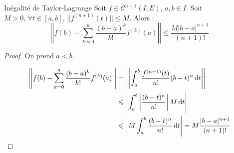 \begin{proposition}{Inégalité de Taylor-Lagrange}{}
    Soit $f \in \mathscr C^{n + 1}(I, E)$, $a, b \in I$.  Soit $M > 0, \, \forall t \in [a, b], \, ||f^{(n + 1)}(t)|| \leqslant M$.
    Alors :
    \[\left|\left| f(b) - \sum_{k = 0 }^{n } \frac{(b - a)^k}{k!} f^{(k)}(a) \right|\right| \leqslant \frac{M |b - a|^{n + 1}}{(n + 1)!}\]
\end{proposition}

\begin{proof}
    On prend $a < b$.

    \begin{align*}
    \left|\left| f(b) - \sum_{k = 0}^n \frac{(b - a)^k}{k!} f^{(k)}(a) \right|\right|  & = \left|\left| \int_a^b \frac{f^{(n + 1)}(t)}{n!} (b - t)^n \,\mathrm{d}t \right|\right| \\
        & \leqslant \left| \int_a^b \left| \frac{(b - t)^n}{n!} \right| M \,\mathrm{d}t \right| \\
        & \leqslant \left| M \int_{a }^{b } \frac{(b - t)^n}{n!} \,\mathrm{d}t \right| = M \frac{|b - a|^{n + 1}}{(n+ 1)!}
    \end{align*}
\end{proof}

